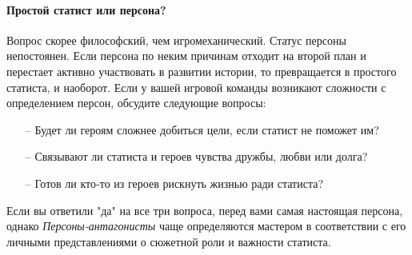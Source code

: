 \paragraph{Простой статист или персона?} Вопрос скорее философский, чем игромеханический. Статус персоны непостоянен. Если персона по неким причинам отходит на второй план и перестает активно участвовать в развитии истории, то превращается в простого статиста, и наоборот. Если у вашей игровой команды возникают сложности с определением персон, обсудите следующие вопросы:
\begin{itemize}
\item[--] Будет ли героям сложнее добиться цели, если статист не поможет им?
\item[--] Связывают ли статиста и героев чувства дружбы, любви или долга?
\item[--] Готов ли кто-то из героев рискнуть жизнью ради статиста?
\end{itemize}
Если вы ответили "да" на все три вопроса, перед вами самая настоящая персона, однако \textit{Персоны-антагонисты} чаще определяются мастером в соответствии с его личными представлениями о сюжетной роли и важности статиста.